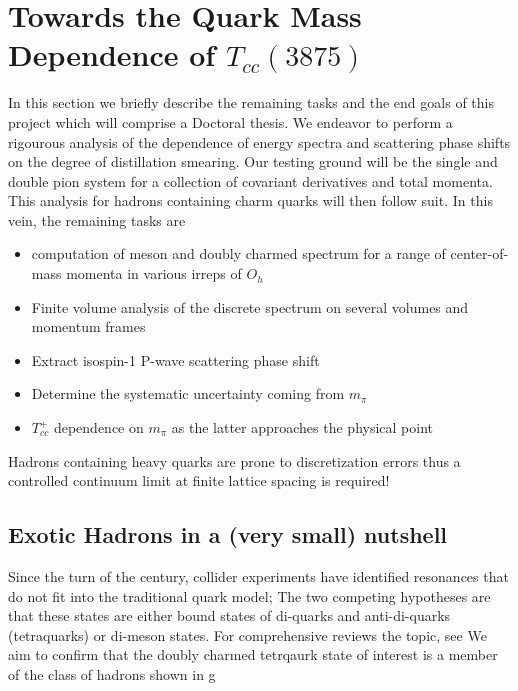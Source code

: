 
\chapter{Towards the Quark Mass Dependence of $T_{cc}(3875)$}
\label{sec:tcc}

In this section we briefly describe the remaining tasks and the end goals of this project which will comprise a Doctoral thesis. We endeavor to perform a rigourous analysis of the dependence of energy spectra and scattering phase shifts on the degree of distillation smearing. Our testing ground will be the single and double pion system for a collection of covariant derivatives and total momenta. This analysis for hadrons containing charm quarks will then follow suit. In this vein, the remaining tasks are 
\begin{itemize}
    \item computation of meson and doubly charmed spectrum for a range of center-of-mass momenta in various irreps of $O_h$
    \item Finite volume analysis of the discrete spectrum on several volumes and momentum frames
    \item Extract isospin-1 P-wave scattering phase shift 
    \item Determine the systematic uncertainty coming from $m_\pi$ 
    \item $T_{cc}^+$ dependence on $m_\pi$ as the latter approaches the physical point
\end{itemize}
Hadrons containing heavy quarks are prone to discretization errors thus a controlled continuum limit at finite lattice spacing is required!


\section{Exotic Hadrons in a (very small) nutshell}
Since the turn of the century, collider experiments have identified resonances that do not fit into the traditional quark model; The two competing hypotheses are that these states are either bound states of di-quarks and anti-di-quarks (tetraquarks) or di-meson states. 
For comprehensive reviews the topic, see \cite{Chen}\cite{Guo:2017jvc} \cite{Brambilla:2019esw}We aim to confirm that the doubly charmed tetrqaurk state of interest is a member of the class of hadrons shown in g

